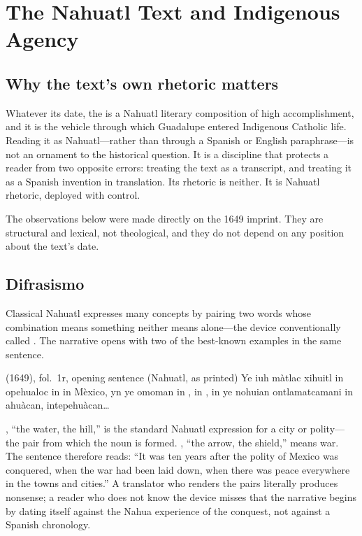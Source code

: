 \sectionguard
\section{The Nahuatl Text and Indigenous Agency}

\subsection{Why the text's own rhetoric matters}

Whatever its date, the  is a Nahuatl literary
composition of high accomplishment, and it is the vehicle through
which Guadalupe entered Indigenous Catholic life. Reading it as
Nahuatl---rather than through a Spanish or English paraphrase---is
not an ornament to the historical question. It is a discipline that
protects a reader from two opposite errors: treating the text as a
transcript, and treating it as a Spanish invention in translation.
Its rhetoric is neither. It is Nahuatl rhetoric, deployed with
control.

The observations below were made directly on the 1649 imprint. They
are structural and lexical, not theological, and they do not depend
on any position about the text's date.

\subsection{Difrasismo}

Classical Nahuatl expresses many concepts by pairing two words whose
combination means something neither means alone---the device
conventionally called . The narrative opens with two
of the best-known examples in the same sentence.

\begin{witnesstext}{ (1649), fol.~1r,
opening sentence (Nahuatl, as printed)}
Ye iuh m\`atlac xihuitl in opehualoc in  in 
M\`exico, yn ye omoman in , in , in ye
nohuian ontlamatcamani in ahu\`acan, intepehu\`acan\ldots{}
\end{witnesstext}

, ``the water, the hill,'' is the standard
Nahuatl expression for a city or polity---the pair from which the
noun  is formed. , ``the
arrow, the shield,'' means war. The sentence therefore reads: ``It was
ten years after the polity of Mexico was conquered, when the war had
been laid down, when there was peace everywhere in the towns and
cities.'' A translator who renders the pairs literally produces
nonsense; a reader who does not know the device misses that the
narrative begins by dating itself against the Nahua experience of the
conquest, not against a Spanish chronology.

